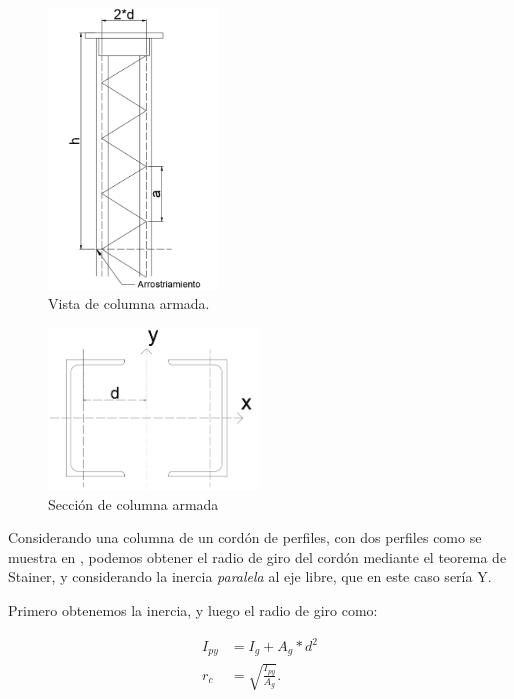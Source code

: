 \documentclass[../main.tex]{subfiles}
\begin{document}
\begin{figure}[htpb]
  \centering
  \includegraphics[width=0.4\textwidth]{../images/resumen/armada}
  \caption{Vista de columna armada.}
  \label{fig:armada}
\end{figure}

\begin{figure}[htpb]
  \centering
  \includegraphics[width=0.5\textwidth]{../images/resumen/armada_trans}
  \caption{Sección de columna armada}
  \label{fig:armada_trans}
\end{figure}

Considerando una columna de un cordón de perfiles, con dos perfiles como se 
muestra en , podemos obtener el radio de giro del cordón
mediante el teorema de Stainer, y considerando la inercia \textit{paralela} al
eje libre, que en este caso sería Y.

Primero obtenemos la inercia, y luego el radio de giro como:

\begin{align*}
  I_{py} &= I_g + A_g * d^2 \\[5pt]
  r_c &=  \sqrt{\frac{I_{py}}{A_g}} 
.\end{align*}
\end{document}
